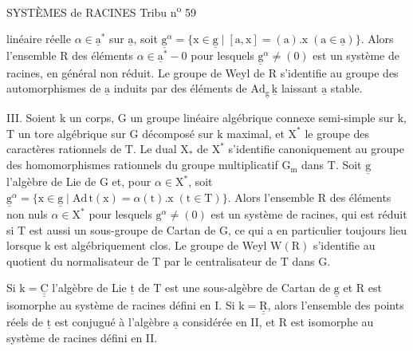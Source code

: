 SYSTÈMES de RACINES \hfill Tribu n\textsuperscript{o} 59

linéaire réelle $\alpha\in\underline{\mathrm a}^{*}$ sur $\underline{\mathrm a}$, soit $\underline{\mathrm g}^{\alpha}=\{\mathrm x\in\underline{\mathrm g}\mid[\mathrm a,\mathrm x]=(\mathrm a).\mathrm x\;(\mathrm a\in\underline{\mathrm a})\}$. Alors l'ensemble $\mathrm R$ des éléments $\alpha\in\underline{\mathrm a}^{*}-0$ pour lesquels $\underline{\mathrm g}^{\alpha}\ne(0)$ est un système de racines, en général non réduit. Le groupe de Weyl de $\mathrm R$ s'identifie au groupe des automorphismes de $\underline{\mathrm a}$ induits par des éléments de $\mathrm{Ad}_{\underline{\mathrm g}}\,\underline{\mathrm k}$ laissant $\underline{\mathrm a}$ stable.

III. Soient $\mathrm k$ un corps, $\mathrm G$ un groupe linéaire algébrique connexe semi-simple sur $\mathrm k$, $\mathrm T$ un tore algébrique sur $\mathrm G$ décomposé sur $\mathrm k$ maximal, et $\mathrm X^{*}$ le groupe des caractères rationnels de $\mathrm T$. Le dual $\mathrm X_{*}$ de $\mathrm X^{*}$ s'identifie canoniquement au groupe des homomorphismes rationnels du groupe multiplicatif $\mathrm G_{\mathrm m}$ dans $\mathrm T$. Soit $\underline{\mathrm g}$ l'algèbre de Lie de $\mathrm G$ et, pour $\alpha\in\mathrm X^{*}$, soit $\underline{\mathrm g}^{\alpha}=\{\mathrm x\in\underline{\mathrm g}\mid\mathrm{Ad}\,\mathrm t(\mathrm x)=\alpha(\mathrm t).\mathrm x\;(\mathrm t\in\mathrm T)\}$. Alors l'ensemble $\mathrm R$ des éléments non nuls $\alpha\in\mathrm X^{*}$ pour lesquels $\mathrm g^{\alpha}\ne(0)$ est un système de racines, qui est réduit si $\mathrm T$ est aussi un sous-groupe de Cartan de $\mathrm G$, ce qui a en particulier toujours lieu lorsque $\mathrm k$ est algébriquement clos. Le groupe de Weyl $\mathrm W(\mathrm R)$ s'identifie au quotient du normalisateur de $\mathrm T$ par le centralisateur de $\mathrm T$ dans $\mathrm G$.

Si $\mathrm k=\underline{\underline{\mathrm C}}$ l'algèbre de Lie $\underline{\mathrm t}$ de $\mathrm T$ est une sous-algèbre de Cartan de $\underline{\mathrm g}$ et $\mathrm R$ est isomorphe au système de racines défini en I. Si $\mathrm k=\underline{\underline{\mathrm R}}$, alors l'ensemble des points réels de $\underline{\mathrm t}$ est conjugué à l'algèbre $\underline{\mathrm a}$ considérée en II, et $\mathrm R$ est isomorphe au système de racines défini en II.

